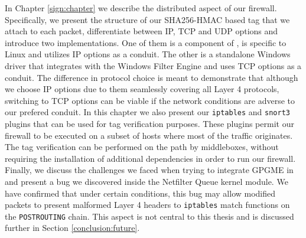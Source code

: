 In Chapter \ref{sign:chapter} we describe the distributed aspect of our firewall.
Specifically, we present the structure of our SHA256-HMAC based tag that we
attach to each packet, differentiate between IP, TCP and UDP options and
introduce two implementations. One of them is a component of \daf{}, is specific
to Linux and utilizes IP options as a conduit. The other is a standalone Windows
driver that integrates with the Windows Filter Engine and uses TCP options as
a conduit. The difference in protocol choice is meant to demonstrate that
although we choose IP options due to them seamlessly covering all Layer 4
protocols, switching to TCP options can be viable if the network conditions are
adverse to our prefered conduit. In this chapter we also present our
\texttt{iptables} and \texttt{snort3} plugins that can be used for tag
verification purposes. These plugins permit our firewall to be executed on a
subset of hosts where most of the traffic originates. The tag verification can
be performed on the path by middleboxes, without requiring the installation of
additional dependencies in order to run our firewall. Finally, we discuss the
challenges we faced when trying to integrate GPGME in \daf{} and present a bug
we discovered inside the Netfilter Queue kernel module. We have confirmed that
under certain conditions, this bug may allow modified packets to present
malformed Layer 4 headers to \texttt{iptables} match functions on the
\texttt{POSTROUTING} chain. This aspect is not central to this thesis and is
discussed further in Section \ref{conclusion:future}.
